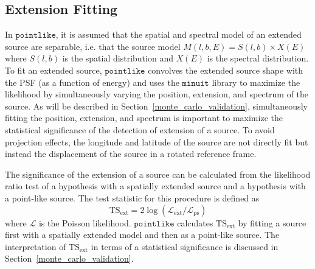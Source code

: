 \documentclass[12pt,preprint]{aastex}
\newcommand{\tsext}{{\ensuremath{\text{TS}_{\text{ext}}}}\xspace}
\newcommand{\likelihood}{\ensuremath{\mathcal{L}}\xspace}
\newcommand{\pointlike}{\ensuremath{\mathtt{pointlike}}\xspace}
\newcommand{\minuit}{\ensuremath{\mathtt{minuit}}\xspace}
\begin{document}
\subsection{Extension Fitting}
\label{extension_fitting}

In \pointlike, it is assumed that the spatial and spectral model
of an extended source are separable, i.e. that the source model
$M(l,b,E)=S(l,b)\times X(E)$ where $S(l,b)$ is the spatial distribution
and $X(E)$ is the spectral distribution.  To fit an extended source,
\pointlike convolves the extended source shape with the PSF (as a function
of energy) and uses the \minuit library \citep{minuit_documentation}
to maximize the likelihood by simultaneously varying the position,
extension, and spectrum of the source.  As will be described in
Section~\ref{monte_carlo_validation}, simultaneously fitting the
position, extension, and spectrum is important to maximize
the statistical significance of the detection of extension of a source.
To avoid projection effects, the longitude and latitude 
of the source are
not directly fit but instead the displacement of the source in a rotated
reference frame.

The significance of the extension of a source can be calculated from the
likelihood ratio test of a hypothesis with a spatially extended source and
a hypothesis with a point-like source. The test statistic for this procedure
is defined as
\begin{equation}
  \tsext=2\log(\likelihood_\text{ext}/\likelihood_\text{ps}) 
\end{equation}
where \likelihood is the Poisson likelihood.
\pointlike calculates \tsext by fitting a source first with a spatially
extended model and then as a point-like source.  The interpretation
of \tsext in terms of a statistical significance is discussed in
Section~\ref{monte_carlo_validation}.
\end{document}
